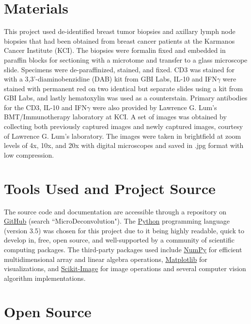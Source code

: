 \documentclass[12pt]{article}
\begin{document}
\section*{Materials}

This project used de-identified breast tumor biopsies and axillary lymph node biopsies that had been obtained from breast cancer patients at the Karmanos Cancer Institute (KCI). The biopsies were formalin fixed and embedded in paraffin blocks for sectioning with a microtome and transfer to a glass microscope slide. Specimens were de-paraffinized, stained, and fixed. CD3 was stained for with a 3,3'-diaminobenzidine (DAB) kit from GBI Labs, IL-10 and IFN$\gamma$ were stained with permanent red on two identical but separate slides using a kit from GBI Labs, and lastly hematoxylin was used as a counterstain. Primary antibodies for the CD3, IL-10 and IFN$\gamma$ were also provided by Lawrence G. Lum’s BMT/Immunotherapy laboratory at KCI. A set of images was obtained by collecting both previously captured images and newly captured images, courtesy of Lawrence G. Lum’s laboratory. The images were taken in brightfield at zoom levels of 4x, 10x, and 20x with digital microscopes and saved in .jpg format with low compression.


\section*{Tools Used and Project Source}

The source code and documentation are accessible through a repository on \href{https://github.com/griffincalme/MicroDeconvolution}{GitHub} (search ``MicroDeconvolution"). The \href{https://www.python.org/}{Python} programming language (version 3.5) was chosen for this project due to it being highly readable, quick to develop in, free, open source, and well-supported by a community of scientific computing packages. The third-party packages used include \href{http://www.numpy.org/}{NumPy} for efficient multidimensional array and linear algebra operations, \href{http://matplotlib.org/}{Matplotlib} for visualizations, and  \href{http://scikit-image.org/}{Scikit-Image} for image operations and several computer vision algorithm implementations.  


\section*{Open Source}
\end{document}
